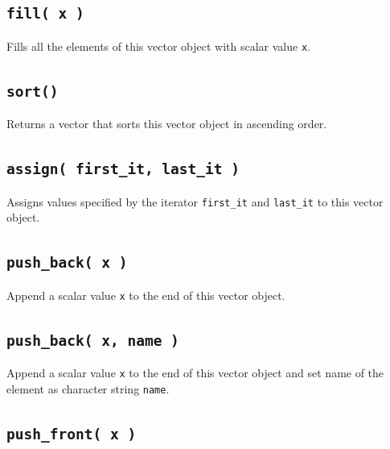 \documentclass[
]{book}
\begin{document}
\hypertarget{fill-x}{%
\subsection{\texorpdfstring{\texttt{fill(\ x\ )}}{fill( x )}}\label{fill-x}}

Fills all the elements of this vector object with scalar value \texttt{x}.

\hypertarget{sort}{%
\subsection{\texorpdfstring{\texttt{sort()}}{sort()}}\label{sort}}

Returns a vector that sorts this vector object in ascending order.

\hypertarget{assign-first_it-last_it}{%
\subsection{\texorpdfstring{\texttt{assign(\ first\_it,\ last\_it\ )}}{assign( first\_it, last\_it )}}\label{assign-first_it-last_it}}

Assigns values specified by the iterator \texttt{first\_it} and \texttt{last\_it} to this vector object.

\hypertarget{push_back-x}{%
\subsection{\texorpdfstring{\texttt{push\_back(\ x\ )}}{push\_back( x )}}\label{push_back-x}}

Append a scalar value \texttt{x} to the end of this vector object.

\hypertarget{push_back-x-name}{%
\subsection{\texorpdfstring{\texttt{push\_back(\ x,\ name\ )}}{push\_back( x, name )}}\label{push_back-x-name}}

Append a scalar value \texttt{x} to the end of this vector object and set name of the element as character string \texttt{name}.

\hypertarget{push_front-x}{%
\subsection{\texorpdfstring{\texttt{push\_front(\ x\ )}}{push\_front( x )}}\label{push_front-x}}
\end{document}
